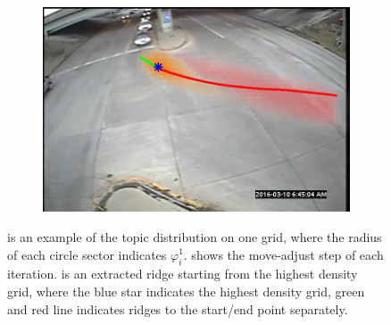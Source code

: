 \begin{figure}
\begin{subfigure}{0.35\linewidth}
        \subcaption{}
        \label{subfig:scene-step}
    \end{subfigure}
    \begin{subfigure}{0.35\linewidth}
        \includegraphics[width=\linewidth]{./img/scene_learning/single_ridge-1.jpg}
        \subcaption{}
        \label{subfig:scene-single-ridge}
    \end{subfigure}%
    \caption{ is an example of the topic distribution on one grid, where the radius of each circle sector indicates $\varphi_i^{1}$.  shows the move-adjust step of each iteration.  is an extracted ridge starting from the highest density grid, where the blue star indicates the highest density grid, green and red line indicates ridges to the start/end point separately.}
    \label{fig:scene-step}
\end{figure}
